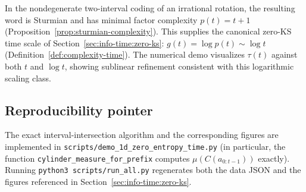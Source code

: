 In the nondegenerate two-interval coding of an irrational rotation, the resulting word is Sturmian and has minimal factor complexity $p(t)=t+1$ (Proposition~\ref{prop:sturmian-complexity}). This supplies the canonical zero-KS time scale of Section~\ref{sec:info-time:zero-ks}: $g(t)=\log p(t)\sim \log t$ (Definition~\ref{def:complexity-time}). The numerical demo visualizes $\tau(t)$ against both $t$ and $\log t$, showing sublinear refinement consistent with this logarithmic scaling class.

\subsection{Reproducibility pointer}\label{sec:appendix:toy:repro}

The exact interval-intersection algorithm and the corresponding figures are implemented in \texttt{scripts/demo\_1d\_zero\_entropy\_time.py} (in particular, the function \texttt{cylinder\_measure\_for\_prefix} computes $\mu(C(a_{0:t-1}))$ exactly). Running \texttt{python3 scripts/run\_all.py} regenerates both the data JSON and the figures referenced in Section~\ref{sec:info-time:zero-ks}.

